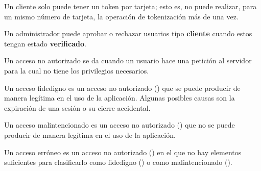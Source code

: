 {
  Un cliente solo puede tener un token por tarjeta; esto es, no puede realizar,
  para un mismo número de tarjeta, la operación de tokenización más de una vez.
}

{
  Un administrador puede aprobar o rechazar usuarios tipo \textbf{cliente}
cuando estos tengan estado \textbf{verificado}.
}

{
  Un acceso no autorizado se da cuando un usuario hace una petición al servidor
  para la cual no tiene los privilegios necesarios.
}

{
  Un acceso fidedigno es un acceso no autorizado
  () que se puede producir de manera
  legítima en el uso de la aplicación. Algunas posibles causas son la expiración
  de una sesión o su cierre accidental.
}


{
  Un acceso malintencionado es un acceso no autorizado
  () que no se puede producir de manera
  legítima en el uso de la aplicación.
}

{
  Un acceso erróneo es un acceso no autorizado
  () en el que no hay elementos
  suficientes para clasificarlo como fidedigno
  () o como malintencionado
  ().
}
